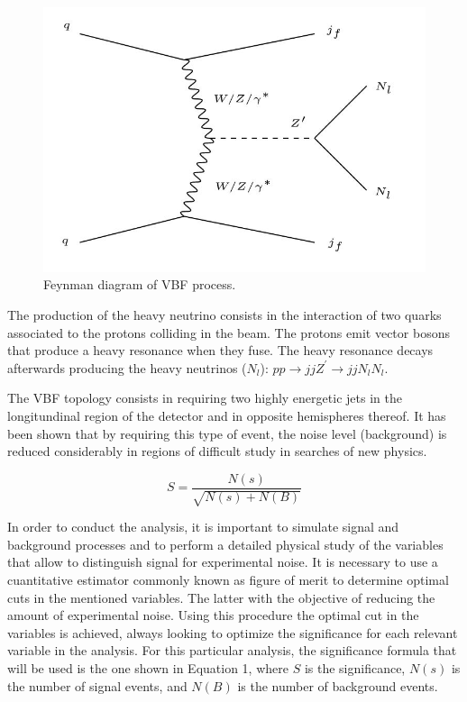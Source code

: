 \documentclass[12pt]{article}
\begin{document}
\begin{figure}[H]
\centering
\includegraphics[scale = 0.65]{Figures/Feynman_VBF.JPG}
\caption{Feynman diagram of VBF process.}
\label{fig: VBF}
\end{figure}

The production of the heavy neutrino consists in the interaction of two quarks associated to the protons colliding in the beam. The protons emit vector bosons that produce a heavy resonance when they fuse. The heavy resonance decays afterwards producing the heavy neutrinos ($N_{l}$): $pp \rightarrow jj Z^{'} \rightarrow jj N_{l}N_{l}$.

The VBF topology consists in requiring two highly energetic jets in the longitundinal region of the detector and in opposite hemispheres thereof. It has been shown that by requiring this type of event, the noise level (background) is reduced considerably in regions of difficult study in searches of new physics.


\begin{equation}
    S = \frac{N(s)}{\sqrt{N(s) + N(B)}}
\end{equation}

In order to conduct the analysis, it is important to simulate signal and background processes and to perform a detailed physical study of the variables that allow to distinguish signal for experimental noise. It is necessary to use a cuantitative estimator commonly known as figure of merit to determine optimal cuts in the mentioned variables. The latter with the objective of reducing the amount of experimental noise. Using this procedure the optimal cut in the variables is achieved, always looking to optimize the significance for each relevant variable in the analysis. For this particular analysis, the significance formula that will be used is the one shown in Equation 1, where $S$ is the significance, $N(s)$ is the number of signal events, and $N(B)$ is the number of background events. 
\end{document}
